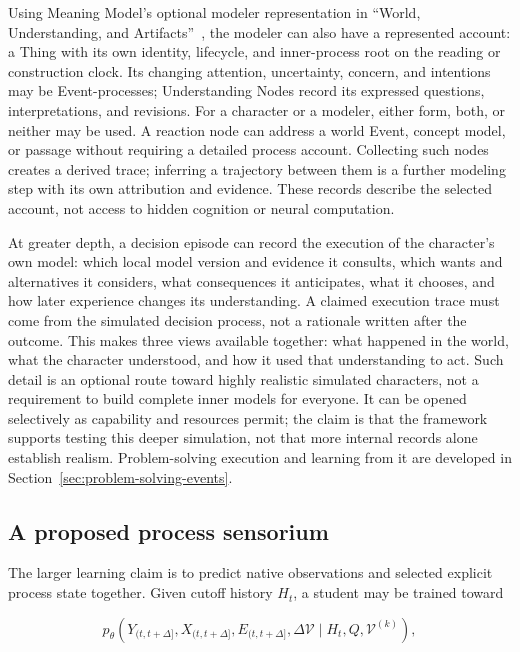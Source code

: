 \documentclass[10pt]{article}
\begin{document}
Using Meaning Model's optional modeler representation in
``World, Understanding, and Artifacts''~\cite{westerbergMeaning2026},
the modeler can also have a represented account: a Thing with its
own identity, lifecycle, and inner-process root on the reading or construction
clock. Its changing attention, uncertainty, concern, and intentions may be
Event-processes; Understanding Nodes record its expressed questions,
interpretations, and revisions. For a character or a modeler, either form,
both, or neither may be used. A reaction node can address a world Event,
concept model, or passage without requiring a detailed process account.
Collecting such nodes creates a derived trace; inferring a trajectory between
them is a further modeling step with its own attribution and evidence.
These records describe the selected account, not access to hidden cognition
or neural computation.

At greater depth, a decision episode can record the execution of the
character's own model: which local model version and evidence it consults,
which wants and alternatives it considers, what consequences it anticipates,
what it chooses, and how later experience changes its understanding. A claimed
execution trace must come from the simulated decision process, not a rationale
written after the outcome. This makes three views available together: what
happened in the world, what the character understood, and how it used that
understanding to act. Such detail is an optional route toward highly realistic
simulated characters, not a requirement to build complete inner models for
everyone. It can be opened selectively as capability and resources permit;
the claim is that the framework supports testing this deeper simulation, not
that more internal records alone establish realism. Problem-solving execution
and learning from it are developed in Section~\ref{sec:problem-solving-events}.

\subsection{A proposed process sensorium}
\label{sec:process-sensorium}

The larger learning claim is to predict native observations and selected
explicit process state together. Given cutoff history $H_t$, a student may be
trained toward

\begin{equation}
 p_{\theta}\!\left(
   Y_{(t,t+\Delta]},X_{(t,t+\Delta]},E_{(t,t+\Delta]},\Delta\mathcal V
   \mid H_t,Q,\mathcal V^{(k)}
 \right),
 \label{eq:joint-process-prediction}
\end{equation}
\end{document}
